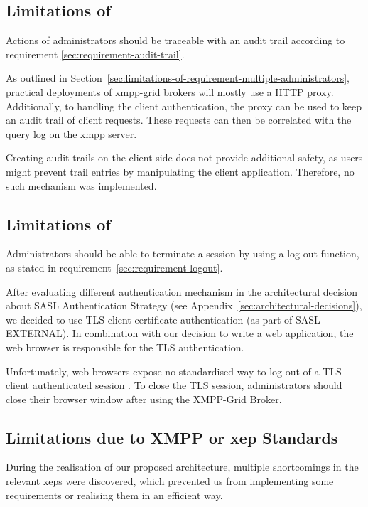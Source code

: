 \subsection{Limitations of \emph{}}

Actions of administrators should be traceable with an audit trail according to requirement \ref{sec:requirement-audit-trail}.

As outlined in Section~\ref{sec:limitations-of-requirement-multiple-administrators}, practical deployments of \gls{xmpp-grid} \glspl{broker} will mostly use a HTTP proxy.
Additionally, to handling the client authentication, the proxy can be used to keep an audit trail of client requests.
These requests can then be correlated with the query log on the \gls{xmpp} server.

Creating audit trails on the client side does not provide additional safety, as users might prevent trail entries by manipulating the client application.
Therefore, no such mechanism was implemented.


\subsection{Limitations of \emph{}}

Administrators should be able to terminate a session by using a log out function, as stated in requirement~\ref{sec:requirement-logout}.

After evaluating different authentication mechanism in the architectural decision about SASL Authentication Strategy (see Appendix~\ref{sec:architectural-decisions}), we decided to use TLS client certificate authentication (as part of SASL EXTERNAL). In combination with our decision to write a web application, the web browser is responsible for the TLS authentication.

Unfortunately, web browsers expose no standardised way to log out of a TLS client authenticated session \cite{practical-issues-with-tls-client}.
To close the TLS session, administrators should close their browser window after using the XMPP-Grid Broker.

\subsection{Limitations due to XMPP or \gls{xep} Standards}

During the realisation of our proposed architecture, multiple shortcomings in the relevant \glspl{xep} were discovered, which prevented us from implementing some requirements or realising them in an efficient way.

